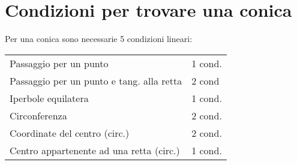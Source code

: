 \section{Condizioni per trovare una conica}

Per una conica sono necessarie 5 condizioni lineari:
\begin{tabular}{ll}
	Passaggio per un punto & 1 cond. \\
	Passaggio per un punto e tang. alla retta & 2 cond \\
	Iperbole equilatera & 1 cond. \\
	Circonferenza & 2 cond. \\
	Coordinate del centro (circ.) & 2 cond. \\
	Centro appartenente ad una retta (circ.) & 1 cond. \\
\end{tabular}
